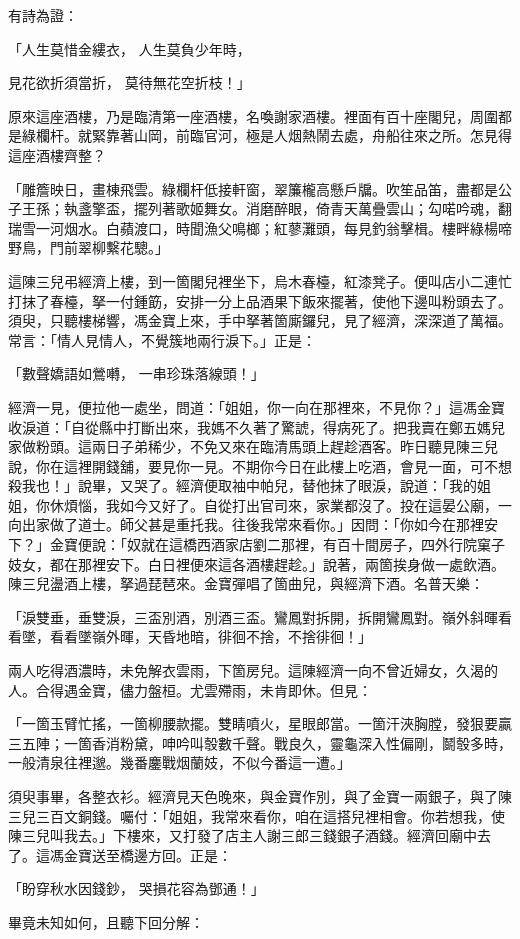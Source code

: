 \begin{showcontents}{}
有詩為證：

「人生莫惜金縷衣，  人生莫負少年時，

見花欲折須當折，  莫待無花空折枝！」

原來這座酒樓，乃是臨清第一座酒樓，名喚謝家酒樓。裡面有百十座閣兒，周圍都是綠欄杆。就緊靠著山岡，前臨官河，極是人烟熱鬧去處，舟船往來之所。怎見得這座酒樓齊整？

「雕簷映日，畫棟飛雲。綠欄杆低接軒窗，翠簾櫳高懸戶牖。吹笙品笛，盡都是公子王孫；執盞擎盃，擺列著歌姬舞女。消磨醉眼，倚青天萬疊雲山；勾喏吟魂，翻瑞雪一河烟水。白蘋渡口，時聞漁父鳴榔；紅蓼灘頭，每見釣翁擊楫。樓畔綠楊啼野鳥，門前翠柳繫花驄。」

這陳三兒弔經濟上樓，到一箇閣兒裡坐下，烏木春檯，紅漆凳子。便叫店小二連忙打抹了春檯，拏一付鍾筯，安排一分上品酒果下飯來擺著，使他下邊叫粉頭去了。須臾，只聽樓梯響，馮金寶上來，手中拏著箇廝鑼兒，見了經濟，深深道了萬福。常言：「情人見情人，不覺簇地兩行淚下。」正是：

「數聲嬌語如鶯囀，  一串珍珠落線頭！」

經濟一見，便拉他一處坐，問道：「姐姐，你一向在那裡來，不見你？」這馮金寶收淚道：「自從縣中打斷出來，我媽不久著了驚諕，得病死了。把我賣在鄭五媽兒家做粉頭。這兩日子弟稀少，不免又來在臨清馬頭上趕趁酒客。昨日聽見陳三兒說，你在這裡開錢舖，要見你一見。不期你今日在此樓上吃酒，會見一面，可不想殺我也！」說畢，又哭了。經濟便取袖中帕兒，替他抹了眼淚，說道：「我的姐姐，你休煩惱，我如今又好了。自從打出官司來，家業都沒了。投在這晏公廟，一向出家做了道士。師父甚是重托我。往後我常來看你。」因問：「你如今在那裡安下？」金寶便說：「奴就在這橋西酒家店劉二那裡，有百十間房子，四外行院窠子妓女，都在那裡安下。白日裡便來這各酒樓趕趁。」說著，兩箇挨身做一處飲酒。陳三兒盪酒上樓，拏過琵琶來。金寶彈唱了箇曲兒，與經濟下酒。名普天樂：

「淚雙垂，垂雙淚，三盃別酒，別酒三盃。鸞鳳對拆開，拆開鸞鳳對。嶺外斜暉看看墜，看看墜嶺外暉，天昏地暗，徘徊不捨，不捨徘徊！」

兩人吃得酒濃時，未免解衣雲雨，下箇房兒。這陳經濟一向不曾近婦女，久渴的人。合得遇金寶，儘力盤桓。尤雲殢雨，未肯即休。但見：

「一箇玉臂忙搖，一箇柳腰款擺。雙睛噴火，星眼郎當。一箇汗浹胸膛，發狠要贏三五陣；一箇香消粉黛，呻吟叫彀數千聲。戰良久，靈龜深入性偏剛，鬬彀多時，一般清泉往裡邈。幾番鏖戰烟蘭妓，不似今番這一遭。」

須臾事畢，各整衣衫。經濟見天色晚來，與金寶作別，與了金寶一兩銀子，與了陳三兒三百文銅錢。囑付：「姐姐，我常來看你，咱在這搭兒裡相會。你若想我，使陳三兒叫我去。」下樓來，又打發了店主人謝三郎三錢銀子酒錢。經濟回廟中去了。這馮金寶送至橋邊方回。正是：

「盼穿秋水因錢鈔，  哭損花容為鄧通！」

畢竟未知如何，且聽下回分解：





\end{showcontents}


